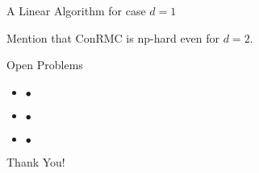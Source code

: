 \documentclass{beamer}
\begin{document}
\begin{frame}{A Linear Algorithm for case $d = 1$}

  Mention that ConRMC is np-hard even for $d = 2$.
  
\end{frame}

\begin{frame}{Open Problems}
  \begin{itemize}
  \item $\bullet$ 
  \item $\bullet$ 
  \item $\bullet$ 
\end{itemize} \vspace{4mm}
\begin{center} \Huge{Thank You!}
  \end{center}
\end{frame}
\end{document}
